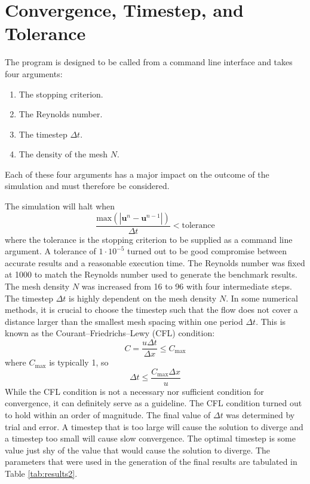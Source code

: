 \section{Convergence, Timestep, and Tolerance}

The program is designed to be called from a command line interface and takes four arguments:
\begin{enumerate}
    \item The stopping criterion.
    \item The Reynolds number.
    \item The timestep $\Delta t$.
    \item The density of the mesh $N$.
\end{enumerate}
Each of these four arguments has a major impact on the outcome of the simulation and must therefore be considered. 

The simulation will halt when
\begin{equation}
    \frac{ \text{max} \left( \left| \mathbf{u}^n - \mathbf{u}^{n-1} \right| \right) }{\Delta t} < \text{tolerance}
\end{equation}
where the tolerance is the stopping criterion to be supplied as a command line argument. A tolerance of $1 \cdot 10^{-5}$ turned out to be good compromise between accurate results and a reasonable execution time. The Reynolds number was fixed at 1000 to match the Reynolds number used to generate the benchmark results. The mesh density $N$ was increased from 16 to 96 with four intermediate steps. The timestep $\Delta t$ is highly dependent on the mesh density $N$. In some numerical methods, it is crucial to choose the timestep such that the flow does not cover a distance larger than the smallest mesh spacing within one period $\Delta t$. This is known as the Courant–Friedrichs–Lewy (CFL) condition:
\begin{equation}
    C = \frac{u \Delta t}{\Delta x} \leq C_{\text{max}}
\end{equation}
where $C_{\text{max}}$ is typically 1, so
\begin{equation}
    \Delta t \leq \frac{C_{\text{max}} \Delta x}{u}
\end{equation}
While the CFL condition is not a necessary nor sufficient condition for convergence, it can definitely serve as a guideline. The CFL condition turned out to hold within an order of magnitude. The final value of $\Delta t$ was determined by trial and error. A timestep that is too large will cause the solution to diverge and a timestep too small will cause slow convergence. The optimal timestep is some value just shy of the value that would cause the solution to diverge. The parameters that were used in the generation of the final results are tabulated in Table \ref{tab:results2}.

